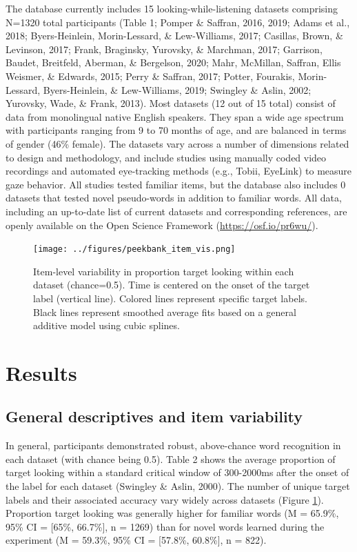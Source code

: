 \documentclass[10pt, letterpaper]{article}
\begin{document}
The database currently includes 15 looking-while-listening datasets
comprising N=1320 total participants (Table 1; Pomper \& Saffran, 2016,
2019; Adams et al., 2018; Byers-Heinlein, Morin-Lessard, \&
Lew-Williams, 2017; Casillas, Brown, \& Levinson, 2017; Frank,
Braginsky, Yurovsky, \& Marchman, 2017; Garrison, Baudet, Breitfeld,
Aberman, \& Bergelson, 2020; Mahr, McMillan, Saffran, Ellis Weismer, \&
Edwards, 2015; Perry \& Saffran, 2017; Potter, Fourakis, Morin-Lessard,
Byers-Heinlein, \& Lew-Williams, 2019; Swingley \& Aslin, 2002;
Yurovsky, Wade, \& Frank, 2013). Most datasets (12 out of 15 total)
consist of data from monolingual native English speakers. They span a
wide age spectrum with participants ranging from 9 to 70 months of age,
and are balanced in terms of gender (46\% female). The datasets vary
across a number of dimensions related to design and methodology, and
include studies using manually coded video recordings and automated
eye-tracking methods (e.g., Tobii, EyeLink) to measure gaze behavior.
All studies tested familiar items, but the database also includes 0
datasets that tested novel pseudo-words in addition to familiar words.
All data, including an up-to-date list of current datasets and
corresponding references, are openly available on the Open Science
Framework (\url{https://osf.io/pr6wu/}).

\begin{figure} 
\texttt{[image: ../figures/peekbank\_item\_vis.png]}
\caption{Item-level variability in proportion target looking within each dataset (chance=0.5). Time is centered on the onset of the target label (vertical line). Colored lines represent specific target labels. Black lines represent smoothed average fits based on a general additive model using cubic splines.}
\label{fig:peekbank_item_vis}
\end{figure}

\hypertarget{results}{%
\section{Results}\label{results}}

\hypertarget{general-descriptives-and-item-variability}{%
\subsection{General descriptives and item
variability}\label{general-descriptives-and-item-variability}}

In general, participants demonstrated robust, above-chance word
recognition in each dataset (with chance being 0.5). Table 2 shows the
average proportion of target looking within a standard critical window
of 300-2000ms after the onset of the label for each dataset (Swingley \&
Aslin, 2000). The number of unique target labels and their associated
accuracy vary widely across datasets (Figure
\ref{fig:peekbank_item_vis}). Proportion target looking was generally
higher for familiar words (M = 65.9\%, 95\% CI = {[}65\%, 66.7\%{]}, n =
1269) than for novel words learned during the experiment (M = 59.3\%,
95\% CI = {[}57.8\%, 60.8\%{]}, n = 822).
\end{document}
